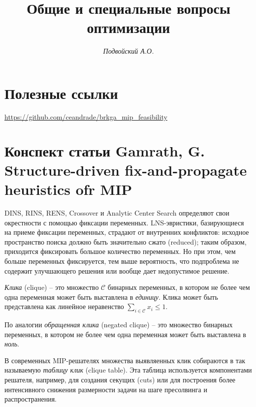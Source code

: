 \documentclass[%
	11pt,
	a4paper,
	utf8,
		]{article}
\begin{document}
\title{Общие и специальные вопросы оптимизации}

\author{\itshape Подвойский А.О.}

\date{}
\maketitle

\thispagestyle{fancy}




\tableofcontents

\section{Полезные ссылки}

\url{https://github.com/ceandrade/brkga_mip_feasibility}

\section{Конспект статьи Gamrath, G. Structure-driven fix-and-propagate heuristics ofr MIP}

DINS, RINS, RENS, Crossover и Analytic Center Search определяют свои окрестности с помощью фиксации переменных. LNS-эвристики, базирующиеся на приеме фиксации переменных, страдают от внутренних конфликтов: исходное пространство поиска должно быть значительно сжато (reduced); таким образом, приходится фиксировать большое количество переменных. Но при этом, чем больше переменных фиксируется, тем выше вероятность, что подпроблема не содержит улучшающего решения или вообще дает недопустимое решение.

\emph{Клика} (clique) -- это множество $ \mathcal{C} $ бинарных переменных, в котором не более чем одна переменная может быть выставлена в \emph{единицу}. Клика может быть представлена как линейное неравенство $ \sum_{i \in \mathcal{C}} x_i \leqslant 1 $.

По аналогии \emph{обращенная клика} (negated clique) -- это множество бинарных переменных, в котором не более чем одна переменная может быть выставлена в \emph{ноль}.

В современных MIP-решателях множества выявляенных клик собираются в так называемую \emph{таблицу клик} (clique table). Эта таблица используется компонентами решателя, например, для создания секущих (cuts) или для построения более интенсивного снижения размерности задачи на шаге пресолвинга и распространения.
\end{document}
